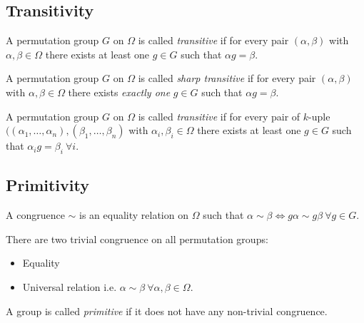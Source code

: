 \subsection{Transitivity}

\begin{definition}
  A permutation group $G$ on $\Omega$ is called \textit{transitive} if for every pair $(\alpha, \beta)$ with $\alpha, \beta \in \Omega$ there exists at least one $g \in G$ such that $\alpha g = \beta$.
\end{definition}

\begin{definition}
  A permutation group $G$ on $\Omega$ is called \textit{sharp transitive} if for every pair $(\alpha, \beta)$ with $\alpha, \beta \in \Omega$ there exists \textit{exactly one} $g \in G$ such that $\alpha g = \beta$.
\end{definition}

\begin{definition}
  A permutation group $G$ on $\Omega$ is called \textit{transitive} if for every pair of $k$-uple $((\alpha_1, \dots, \alpha_n), (\beta_1, \dots, \beta_n)$ with $\alpha_i, \beta_i \in \Omega$ there exists at least one $g \in G$ such that $\alpha_i g = \beta_i \  \forall i$.
\end{definition}

\subsection{Primitivity}

\begin{definition}[Congruence]
  A congruence $\sim$ is an equality relation on $\Omega$ such that $\alpha \sim \beta \Leftrightarrow g\alpha \sim g\beta \ \forall g \in G$.
\end{definition}

There are two trivial congruence on all permutation groups:
\begin{itemize}
  \item Equality
  \item Universal relation i.e. $\alpha \sim \beta \ \forall \alpha, \beta \in \Omega$.
\end{itemize}

\begin{definition}
  A group is called \textit{primitive} if it does not have any non-trivial congruence.
\end{definition}

